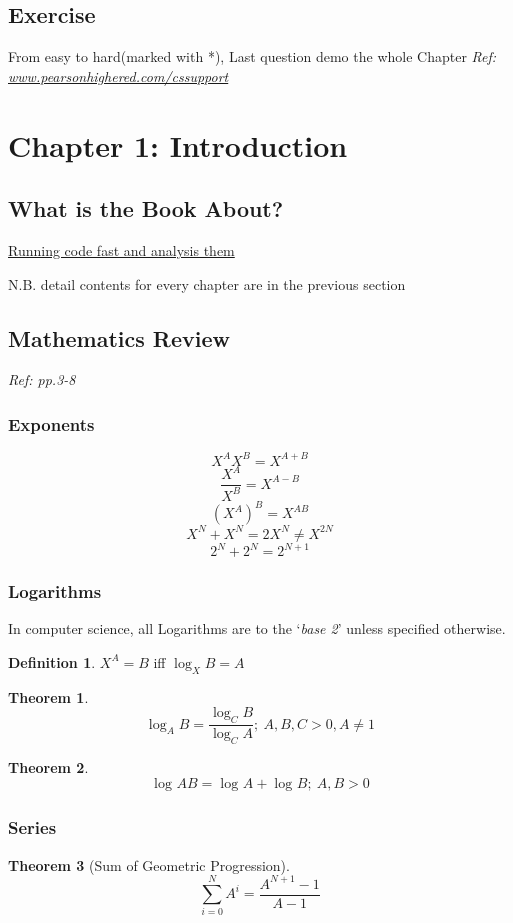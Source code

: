 \documentclass[12pt]{article}
\theoremstyle{definition}
\newtheorem{definition}{Definition}[section]
\newtheorem{theorem}{Theorem}[section]
\begin{document}
\subsection{Exercise}
From easy to hard(marked with *), Last question demo the whole Chapter
\textit{Ref: \url{www.pearsonhighered.com/cssupport}}

\section{Chapter 1: Introduction}
\subsection{What is the Book About?}
\underline{Running code fast and analysis them}

N.B. detail contents for every chapter are in the previous section

\subsection{Mathematics Review}
\emph{Ref: pp.3-8}

\subsubsection{Exponents}
$$X^AX^B = X^{A+B}$$
$$\frac{X^A}{X^B} = X^{A-B}$$
$$(X^A)^B = X^{AB}$$
$$X^N + X^N = 2X^N \neq X^{2N}$$
$$2^N + 2^N = 2^{N+1}$$

\subsubsection{Logarithms}
In computer science, all Logarithms are to the `\emph{base 2}' unless specified otherwise.

\theoremstyle{definition}
\begin{definition}
    $X^A = B$ iff $\log_{X}B = A$
\end{definition}

\begin{theorem}
    $$\log_{A}B = \frac{\log_{C}B}{\log_{C}A};\ A,B,C > 0, A \neq 1$$
\end{theorem}

\begin{theorem}
    $$\log_{}AB = \log_{}A + \log_{}B;\ A, B > 0$$
\end{theorem}


\subsubsection{Series}
\begin{theorem}[Sum of Geometric Progression]
    $$\sum_{i=0}^{N} A^{i}= \frac{A^{N+1} - 1}{A - 1}$$
\end{theorem}
\end{document}
